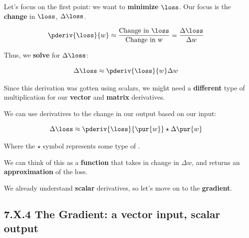         Let's focus on the first point: we want to \textbf{minimize} $\loss$. Our focus is the \textbf{change} in $\loss$, $\Delta \loss$.
        
        \begin{equation}
            \pderiv{\loss}{w} 
            \approx 
            \frac{\text{Change in }\loss }{ \text{Change in w} }
            =
            \frac{\Delta \loss}{ \Delta w}
        \end{equation}
        
        Thus, we \textbf{solve} for $\Delta \loss$:
        
        \begin{equation}
            \Delta \loss
            \approx
            \pderiv{\loss}{w} 
            \Delta w
        \end{equation}
        
        Since this derivation was gotten using scalars, we might need a \textbf{different} type of multiplication for our \textbf{vector} and \textbf{matrix} derivatives.\\
        
        \begin{concept}
            We can use derivatives to  the change in our output based on our input:
            
            \begin{equation*}
                \Delta \loss
                \approx
                \pderiv{\loss}{\pur{w}} 
                \star
                \Delta \pur{w}
            \end{equation*}
            
            Where the $\star$ symbol represents some type of .
            
        \end{concept}
        
        We can think of this as a \textbf{function} that takes in change in $\Delta w$, and returns an \textbf{approximation} of the loss.
        
        We already understand \textbf{scalar} derivatives, so let's move on to the \textbf{gradient}.
        
    \secdiv
    
    \subsection*{7.X.4 \quad The Gradient: a vector input, scalar output}
    
